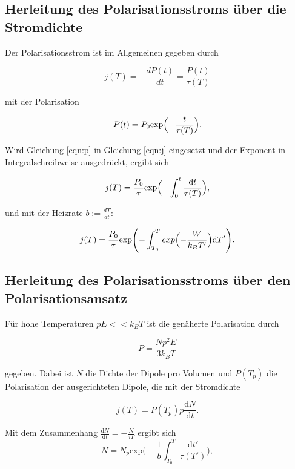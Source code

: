 \subsection{Herleitung des Polarisationsstroms über die Stromdichte}
Der Polarisationsstrom ist im Allgemeinen gegeben durch

\begin{equation}
    \label{eqn:j}
    j(T) = -\frac{dP(t)}{dt} = \frac{P(t)}{\tau(T)}
\end{equation}

\noindent
mit der Polarisation 

\begin{equation}
    \label{eqn:p}
    P(t) = P_0 \text{exp} \Bigl( - \frac{t}{\tau(T)} \Bigr).
\end{equation}

\noindent
Wird Gleichung \ref{eqn:p} in Gleichung \ref{eqn:j} eingesetzt und der Exponent in Integralschreibweise ausgedrückt, ergibt sich

\begin{equation}
    j(T) = \frac{P_0}{\tau} \text{exp} \Bigl( - \int_0^t \frac{\text{d}t}{\tau(T)} \Bigr),    
\end{equation} 

\noindent
und mit der Heizrate $b := \frac{dT}{dt}$:

\begin{equation}
    j(T) = \frac{P_0}{\tau} \text{exp} \Biggl( - \int_{T_0}^T exp \Bigl( -\frac{W}{k_B T'} \Bigr) \text{d}T' \Biggr).
\end{equation}


\subsection{Herleitung des Polarisationsstroms über  den Polarisationsansatz}
Für hohe Temperaturen $p E << k_B T $ ist die genäherte Polarisation durch 

\begin{equation}
    P = \frac{N p^2 E}{3 k_B T} 
\end{equation}

\noindent
gegeben. Dabei ist $N$ die Dichte der Dipole pro Volumen und $P(T_p)$ die Polarisation der ausgerichteten Dipole, die mit der Stromdichte

\begin{equation}
    j(T) = P(T_p) p \frac{\text{d}N}{\text{d}t} .
\end{equation}

\noindent
Mit dem Zusammenhang $\frac{\text{d}N}{\text{d}t} = -\frac{N}{\tau{T}}$ ergibt sich
\begin{equation}
    N = N_p \text{exp} \Biggl( -\frac{1}{b} \int_{T_0}^{T} \frac{\text{d}t'}{\tau(T')} \Biggr),  
\end{equation}

